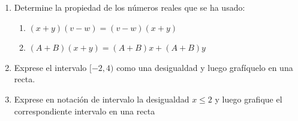 \documentclass[fleqn]{article}
\newcommand{\LineaNombre}{%
\par
\vspace{\baselineskip}
Nombre:\hrulefill \qquad Curso: \underline{\hspace*{48pt}} \qquad Fecha: \underline{\hspace*{2.5cm}} \relax
\par}
\begin{document}
\begin{enumerate}
   \item Determine la propiedad de los números reales que se ha usado:
  \begin{enumerate}
    \item $ (x+y)(v-w)=(v-w)(x+y) $ 
    \item $ (A+B)(x+y)=(A+B)x+(A+B)y $
  \end{enumerate}
  \item Exprese el intervalo \: $ [-2,4) $ \: como una desigualdad y luego grafíquelo en una recta.   
  \item Exprese en notación de intervalo la desigualdad \: $ x\leq 2 $ \: y luego grafique el correspondiente intervalo en una recta


\end{enumerate}
\end{document}
